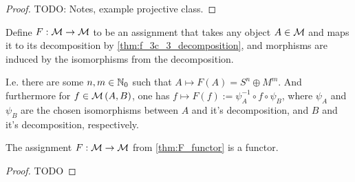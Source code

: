 \begin{lemma}
\begin{enumerate}
{\begin{center}
            \end{center}
        }
    \end{enumerate}
\end{lemma}
\begin{proof}
    TODO: Notes, example projective class.
\end{proof}

\begin{definition} \label{thm:F_functor}
    Define \( F: {\mathcal{M}} \to {\mathcal{M}} \) to be an assignment that takes any object \( A \in {\mathcal{M}} \) and maps it to its decomposition by \autoref{thm:f_3c_3_decomposition}, and morphisms are induced by the isomorphisms from the decomposition. 
    
    I.e. there are some \( n, m \in {\mathbb{N}}_0 \) such that \( A \mapsto F(A) = S^n \oplus M^m \). And furthermore for \( f \in {\mathcal{M}}\left( A, B \right) \), one has \( f \mapsto F(f) := \psi_A^{-1} \circ f \circ \psi_B \), where \( \psi_A \) and \( \psi_B \) are the chosen isomorphisms between \( A \) and it's decomposition, and \( B \) and it's decomposition, respectively.
\end{definition}

\begin{lemma}
    The assignment \( F: {\mathcal{M}} \to {\mathcal{M}} \) from \autoref{thm:F_functor} is a functor.
\end{lemma}
\begin{proof}
    TODO
\end{proof}

